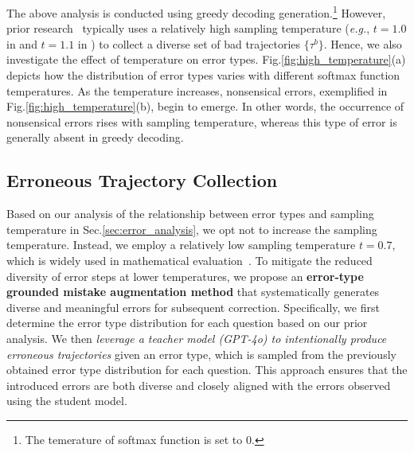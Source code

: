 \documentclass[11pt]{article}
\begin{document}
The above analysis is conducted using greedy decoding generation.\footnote{The temerature of softmax function is set to 0.} However, prior research~\cite{xi2024enhancing,yan2024s,lu2024step,zhang-etal-2024-small} typically uses a relatively high sampling temperature (\textit{e.g.}, $t=1.0$ in \citet{yan2024s} and $t=1.1$ in \citet{lu2024step}) to collect a diverse set of bad trajectories $\{\tau^{b}\}$. Hence, we also investigate the effect of temperature on error types.
Fig.\ref{fig:high_temperature}(a) depicts how the distribution of error types varies with different softmax function temperatures. As the temperature increases, nonsensical errors, exemplified in Fig.\ref{fig:high_temperature}(b), begin to emerge. In other words, the occurrence of nonsensical errors rises with sampling temperature, whereas this type of error is generally absent in greedy decoding. 

\subsection{Erroneous Trajectory Collection}
\label{sec:erroneous_trajectory_collection}

Based on our analysis of the relationship between error types and sampling temperature in Sec.\ref{sec:error_analysis}, we opt not to increase the sampling temperature. Instead, we employ a relatively low sampling temperature $t=0.7$, which is widely used in mathematical evaluation~\cite{xi2024enhancing,yan2024s,zhang-etal-2024-learn}. To mitigate the reduced diversity of error steps at lower temperatures, we propose an \textbf{error-type grounded mistake augmentation method} that systematically generates diverse and meaningful errors for subsequent correction.
Specifically, we first determine the error type distribution for each question based on our prior analysis. We then \textit{leverage a teacher model (GPT-4o) to intentionally produce erroneous trajectories} given an error type, which is sampled from the previously obtained error type distribution for each question. This approach ensures that the introduced errors are both diverse and closely aligned with the errors observed using the student model. 
\end{document}
